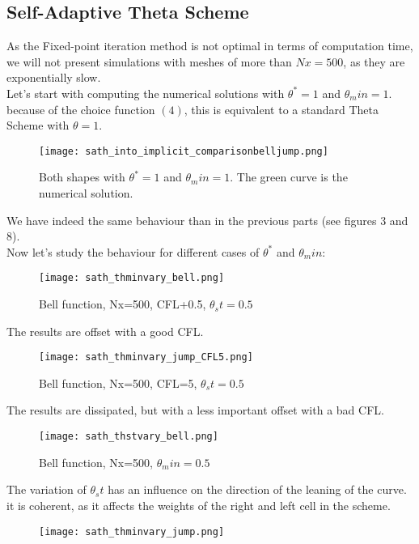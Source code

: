 \documentclass[12pt]{article}
\begin{document}
\subsection*{Self-Adaptive Theta Scheme}
As the Fixed-point iteration method is not optimal in terms of computation time, we will not present simulations with meshes of more than $Nx=500$, as they are exponentially slow.\\

Let's start with computing the numerical solutions with $\theta^* = 1$ and $\theta_min = 1$.
because of the choice function $(4)$, this is equivalent to a standard Theta Scheme with $\theta = 1$.

\begin{figure}[H]
    \centering
    \texttt{[image: sath\_into\_implicit\_comparisonbelljump.png]}
    \caption{Both shapes with $\theta^* = 1$ and $\theta_min = 1$. The green curve is the numerical solution.}
\end{figure}
We have indeed the same behaviour than in the previous parts (see figures 3 and 8).\\

Now let's study the behaviour for different cases of $\theta^*$ and $\theta_min$:

\begin{figure}[H]
    \centering
    \texttt{[image: sath\_thminvary\_bell.png]}
    \caption{Bell function, Nx=500, CFL+0.5, $\theta_st=0.5$}
\end{figure}
The results are offset with a good CFL.

\begin{figure}[H]
    \centering
    \texttt{[image: sath\_thminvary\_jump\_CFL5.png]}
    \caption{Bell function, Nx=500, CFL=5, $\theta_st=0.5$}
\end{figure}
The results are dissipated, but with a less important offset with a  bad CFL.

\begin{figure}[H]
    \centering
    \texttt{[image: sath\_thstvary\_bell.png]}
    \caption{Bell function, Nx=500, $\theta_min=0.5$}
\end{figure}
The variation of $\theta_st$ has an influence on the direction of the leaning of the curve. it is coherent, as it affects the weights of the right and left cell in the scheme.

\begin{figure}[H]
    \centering
    \texttt{[image: sath\_thminvary\_jump.png]}
\end{figure}
\end{document}
